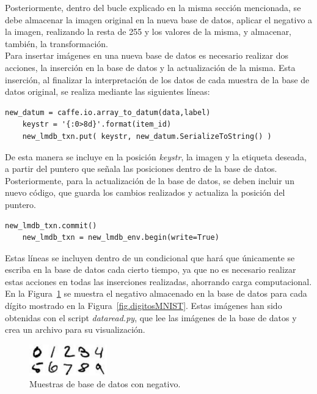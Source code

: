 Posteriormente, dentro del bucle explicado en la misma sección mencionada, se debe almacenar la imagen original en la nueva base de datos, aplicar el negativo a la imagen, realizando la resta de 255 y los valores de la misma, y almacenar, también, la transformación.\\

Para insertar imágenes en una nueva base de datos es necesario realizar dos acciones, la inserción en la base de datos y la actualización de la misma. Esta inserción, al finalizar la interpretación de los datos de cada muestra de la base de datos original, se realiza mediante las siguientes líneas:
\vspace{10pt}
\begin{lstlisting}[frame=single]
	new_datum = caffe.io.array_to_datum(data,label)
	keystr = '{:0>8d}'.format(item_id)
	new_lmdb_txn.put( keystr, new_datum.SerializeToString() )
\end{lstlisting}

De esta manera se incluye en la posición \textit{keystr}, la imagen y la etiqueta deseada, a partir del puntero que señala las posiciones dentro de la base de datos.\\

Posteriormente, para la actualización de la base de datos, se deben incluir un nuevo código, que guarda los cambios realizados y actualiza la posición del puntero.
\vspace{10pt}
\begin{lstlisting}[frame=single]
	new_lmdb_txn.commit()
	new_lmdb_txn = new_lmdb_env.begin(write=True)
\end{lstlisting}

Estas líneas se incluyen dentro de un condicional que hará que únicamente se escriba en la base de datos cada cierto tiempo, ya que no es necesario realizar estas acciones en todas las inserciones realizadas, ahorrando carga computacional.\\

En la Figura~\ref{fig.neg} se muestra el negativo almacenado en la base de datos para cada dígito mostrado en la Figura~\ref{fig.digitosMNIST}. Estas imágenes han sido obtenidas con el script \textit{dataread.py}, que lee las imágenes de la base de datos y crea un archivo para su visualización.\\

\begin{figure}[H]
	\begin{center}
		\includegraphics[width=0.3\textwidth]{figures/negativo}
		\caption{Muestras de base de datos con negativo.}
		\label{fig.neg}
	\end{center}
\end{figure}

